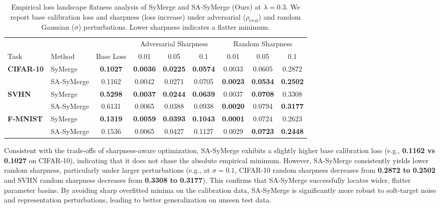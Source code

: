 \documentclass{article}
\theoremstyle{plain}
\theoremstyle{definition}
\theoremstyle{remark}
\begin{document}
\begin{table}[t]
\caption{Empirical loss landscape flatness analysis of SyMerge and SA-SyMerge (Ours) at $\lambda = 0.3$. We report base calibration loss and sharpness (loss increase) under adversarial ($\rho_{\text{eval}}$) and random Gaussian ($\sigma$) perturbations. Lower sharpness indicates a flatter minimum.}
\label{tab:sharpness_results}
\begin{center}
\begin{small}
\begin{sc}
\begin{tabular}{llccccccc}
\toprule
& & & \multicolumn{3}{c}{Adversarial Sharpness} & \multicolumn{3}{c}{Random Sharpness} \\
\cmidrule(lr){4-6} \cmidrule(lr){7-9}
Task & Method & Base Loss & 0.01 & 0.05 & 0.1 & 0.01 & 0.05 & 0.1 \\
\midrule
\textbf{CIFAR-10} & SyMerge & \textbf{0.1027} & \textbf{0.0036} & \textbf{0.0225} & \textbf{0.0574} & 0.0033 & 0.0605 & 0.2872 \\
& SA-SyMerge & 0.1162 & 0.0042 & 0.0271 & 0.0705 & \textbf{0.0023} & \textbf{0.0534} & \textbf{0.2502} \\
\midrule
\textbf{SVHN} & SyMerge & \textbf{0.5298} & \textbf{0.0037} & \textbf{0.0244} & \textbf{0.0639} & 0.0037 & \textbf{0.0708} & 0.3308 \\
& SA-SyMerge & 0.6131 & 0.0065 & 0.0388 & 0.0938 & \textbf{0.0020} & 0.0794 & \textbf{0.3177} \\
\midrule
\textbf{F-MNIST} & SyMerge & \textbf{0.1319} & \textbf{0.0059} & \textbf{0.0393} & \textbf{0.1043} & \textbf{0.0001} & 0.0724 & 0.2623 \\
& SA-SyMerge & 0.1536 & 0.0065 & 0.0427 & 0.1127 & 0.0029 & \textbf{0.0723} & \textbf{0.2448} \\
\bottomrule
\end{tabular}
\end{sc}
\end{small}
\end{center}
\end{table}

Consistent with the trade-offs of sharpness-aware optimization, SA-SyMerge exhibits a slightly higher base calibration loss (e.g., \textbf{0.1162 vs 0.1027} on CIFAR-10), indicating that it does not chase the absolute empirical minimum. However, SA-SyMerge consistently yields lower random sharpness, particularly under larger perturbations (e.g., at $\sigma = 0.1$, CIFAR-10 random sharpness decreases from \textbf{0.2872 to 0.2502} and SVHN random sharpness decreases from \textbf{0.3308 to 0.3177}). This confirms that SA-SyMerge successfully locates wider, flatter parameter basins. By avoiding sharp overfitted minima on the calibration data, SA-SyMerge is significantly more robust to soft-target noise and representation perturbations, leading to better generalization on unseen test data.
\end{document}
